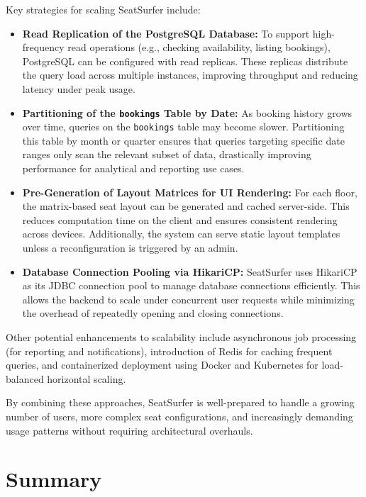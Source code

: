 \documentclass[12pt,a4paper]{report}
\begin{document}
Key strategies for scaling SeatSurfer include:

\begin{itemize}
    \item \textbf{Read Replication of the PostgreSQL Database:} To support high-frequency read operations (e.g., checking availability, listing bookings), PostgreSQL can be configured with read replicas. These replicas distribute the query load across multiple instances, improving throughput and reducing latency under peak usage.

    \item \textbf{Partitioning of the \texttt{bookings} Table by Date:} As booking history grows over time, queries on the \texttt{bookings} table may become slower. Partitioning this table by month or quarter ensures that queries targeting specific date ranges only scan the relevant subset of data, drastically improving performance for analytical and reporting use cases.

    \item \textbf{Pre-Generation of Layout Matrices for UI Rendering:} For each floor, the matrix-based seat layout can be generated and cached server-side. This reduces computation time on the client and ensures consistent rendering across devices. Additionally, the system can serve static layout templates unless a reconfiguration is triggered by an admin.

    \item \textbf{Database Connection Pooling via HikariCP:} SeatSurfer uses HikariCP as its JDBC connection pool to manage database connections efficiently. This allows the backend to scale under concurrent user requests while minimizing the overhead of repeatedly opening and closing connections.
\end{itemize}

Other potential enhancements to scalability include asynchronous job processing (for reporting and notifications), introduction of Redis for caching frequent queries, and containerized deployment using Docker and Kubernetes for load-balanced horizontal scaling.

By combining these approaches, SeatSurfer is well-prepared to handle a growing number of users, more complex seat configurations, and increasingly demanding usage patterns without requiring architectural overhauls.

\section{Summary}
\end{document}
